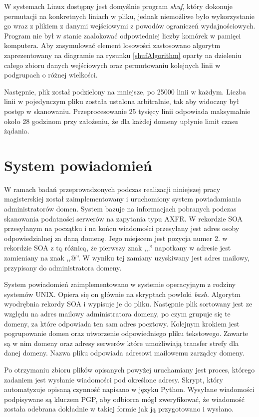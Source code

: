 W systemach Linux dostępny jest domyślnie program \textit{shuf}\cite{shuf}, który dokonuje permutacji na konkretnych liniach w pliku,
jednak niemożliwe było wykorzystanie go wraz z plikiem z danymi wejściowymi z powodów ograniczeń wydajnościowych. Program nie był w
stanie zaalokować odpowiedniej liczby komórek w pamięci komputera. Aby zasymulować element losowości zastosowano algorytm zaprezentowany
na diagramie na rysunku \ref{shufAlgorithm} oparty na dzieleniu całego zbioru danych wejściowych oraz permutowaniu kolejnych linii
w podgrupach o różnej wielkości.

Następnie, plik został podzielony na mniejsze, po 25000 linii w każdym. Liczba linii w pojedynczym pliku została ustalona arbitralnie,
tak aby widoczny był postęp w skanowaniu. Przeprocesowanie 25 tysięcy linii odpowiada maksymalnie około 28 godzinom przy założeniu,
że dla każdej domeny upłynie limit czasu żądania.

\section{System powiadomień}
W ramach badań przeprowadzonych podczas realizacji niniejszej pracy magisterskiej został zaimplementowany i uruchomiony system
powiadamiania administratorów domen. System bazuje na informacjach pobranych podczas skanowania podatności serwerów na zapytania
typu AXFR. W rekordzie SOA przesyłanym na początku i na końcu wiadomości przesyłany jest adres osoby odpowiedzialnej za daną domenę.
Jego miejscem jest pozycja numer 2. w rekordzie SOA z tą różnicą, że pierwszy znak ,,.'' napotkany w adresie jest zamieniany na
znak ,,@''. W wyniku tej zamiany uzyskiwany jest adres mailowy, przypisany do administratora domeny.

System powiadomień zaimplementowano w systemie operacyjnym z rodziny systemów UNIX. Opiera się on głównie na skryptach powłoki
\textit{bash}. Algorytm wyodrębnia rekordy SOA i wypisuje je do pliku. Następnie plik sortowany jest ze względu na adres mailowy
administratora domeny, po czym grupuje się te domeny, za które odpowiada ten sam adres pocztowy. Kolejnym krokiem jest pogrupowanie
domen oraz utworzenie odpowiedniego pliku tekstowego. Zawarte są w nim domeny oraz adresy serwerów które umożliwiają transfer
strefy dla danej domeny. Nazwa pliku odpowiada adresowi mailowemu zarządcy domeny.

Po otrzymaniu zbioru plików opisanych powyżej uruchamiany jest proces, którego zadaniem jest wysłanie wiadomości pod określone
adresy. Skrypt, który automatyzuje opisaną czynność napisano w języku Python\cite{python}. Wysyłane wiadomości podpisywane są
kluczem PGP\cite{RFC4880}, aby odbiorca mógł zweryfikować, że wiadomość została odebrana dokładnie w takiej formie jak ją przygotowano
i wysłano.
